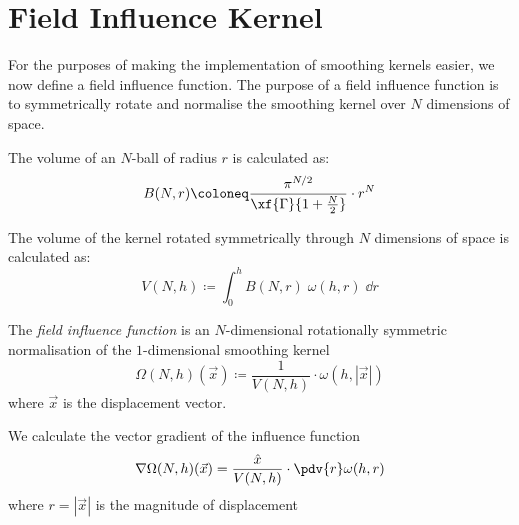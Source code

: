 
\section{Field Influence Kernel}

For the purposes of making the implementation of smoothing kernels easier, we now define a field influence function. The purpose of a field influence function is to symmetrically rotate and normalise the smoothing kernel over $N$ dimensions of space.

\begin{definition}
    The volume of an $N$-ball of radius $r$ is calculated as:
    \[ B(N,r) \coloneq \frac{ \pi^{N / 2} }{ \xf{\Gamma}{ 1 + \frac{N}{2} } } \cdot r^N \]
\end{definition}

\begin{definition}
    The volume of the kernel rotated symmetrically through $N$ dimensions of space is calculated as:
    \[ V(N,h) \coloneq \int_0^h B(N,r) \; \omega(h,r) \; \dd{r} \]
\end{definition}

\begin{definition}
    The \emph{field influence function} is an $N$-dimensional rotationally symmetric normalisation of the $1$-dimensional smoothing kernel
    \begin{equation}
        \Omega(N,h)(\vec{x}) \coloneq \frac{1}{V(N,h)} \cdot \omega(h,|\vec{x}|)
    \end{equation}
    where $\vec{x}$ is the displacement vector.
\end{definition}

\begin{theorem}
    We calculate the vector gradient of the influence function
    \begin{equation}
        \nabla \Omega(N,h)(\vec{x}) = \frac{\hat{x}}{V(N,h)} \cdot \pdv{r} \omega(h,r)
    \end{equation}
    where $r = |\vec{x}|$ is the magnitude of displacement
\end{theorem}
